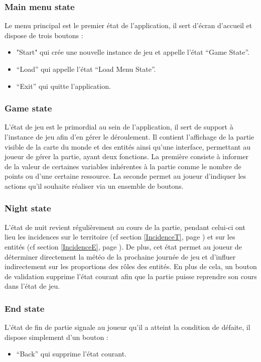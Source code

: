 \documentclass[a4paper]{article}
\newcommand{\alinea}{\hspace*{0.5cm}}
\begin{document}
			\subsubsection{Main menu state}
				\alinea
		Le menu principal est le premier état de l’application, il sert d’écran d’accueil et dispose de trois boutons :
	 		        \begin{itemize}[label=-] 
			             \item "Start" qui crée une nouvelle instance de jeu et appelle l’état “Game State”.
			             \item “Load” qui appelle l’état “Load Menu State”.
				   \item“Exit” qui quitte l’application.
			        \end{itemize}
			\subsubsection{Game state}
				\alinea L’état de jeu est le primordial au sein de l’application, il sert de support à l’instance de jeu afin d’en gérer le déroulement. Il contient l’affichage de la partie visible de la carte du monde et des entités ainsi qu’une interface, permettant au joueur de gérer la partie, ayant deux fonctions. La première consiste à informer de la valeur de certaines variables inhérentes à la partie comme le nombre de points ou d’une certaine ressource. La seconde permet au joueur d’indiquer les actions qu’il souhaite réaliser via un ensemble de boutons.
			\subsubsection{Night state}
\alinea L’état de nuit revient régulièrement au cours de la partie, pendant celui-ci ont lieu les incidences sur le territoire (cf  section \ref{IncidenceT}, page \pageref{IncidenceT}) et sur les entités (cf  section \ref{IncidenceE}, page \pageref{IncidenceE}).
De plus, cet état permet au joueur de déterminer directement la météo de la prochaine journée de jeu et d’influer indirectement sur les proportions des rôles des entités. En plus de cela, un bouton de validation supprime l’état courant afin que la partie puisse reprendre son cours dans l’état de jeu.
			\subsubsection{End state}
			       \alinea L’état de fin de partie signale au joueur qu’il a atteint la condition de défaite, il dispose simplement d’un bouton :
			       \begin{itemize}[label=-] 
			             \item “Back” qui supprime l’état courant.
			        \end{itemize}
\end{document}
